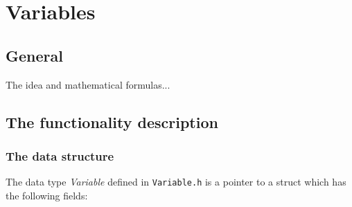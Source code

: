 \documentclass[12pt,a4paper]{report}
\begin{document}
\section{Variables}
\subsection{General}

The idea and mathematical formulas...

\subsection{The functionality description}

\subsubsection{The data structure}
The data type {\it Variable} defined in \verb+Variable.h+ is a pointer 
to a struct which has the following fields: 
\end{document}
